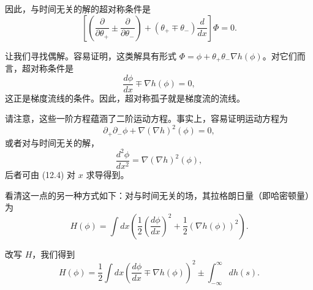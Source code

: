 因此，与时间无关的解的超对称条件是
\begin{equation}
  \tag{12.3}
  \label{eq:12-3}
  \left[\left(\frac{\partial}{\partial\theta_+}\pm\frac{\partial}{\partial\theta_-}\right)
  +(\theta_+\mp\theta_-)\frac{d}{dx}\right]\Phi=0.
\end{equation}

让我们寻找偶解。容易证明，这类解具有形式 $\Phi=\phi+\theta_+\theta_-\nabla h(\phi)$。对它们而言，超对称条件是
\begin{equation}
  \tag{12.4}
  \label{eq:12-4}
  \frac{d\phi}{dx}\mp\nabla h(\phi)=0,
\end{equation}
这正是梯度流线的条件。因此，超对称孤子就是梯度流的流线。

请注意，这些一阶方程蕴涵了二阶运动方程。事实上，容易证明运动方程为
\begin{equation}
  \tag{12.5}
  \label{eq:12-5}
  \partial_+\partial_-\phi+\nabla(\nabla h)^2(\phi)=0,
\end{equation}
或者对与时间无关的解，
\begin{equation}
  \tag{12.6}
  \label{eq:12-6}
  \frac{d^2\phi}{dx^2}=\nabla(\nabla h)^2(\phi),
\end{equation}
后者可由 (12.4) 对 $x$ 求导得到。


看清这一点的另一种方式如下：对与时间无关的场，其拉格朗日量（即哈密顿量）为
\begin{equation}
  \tag{12.7}
  \label{eq:12-7}
  H(\phi)=\int dx\left(\frac12\left(\frac{d\phi}{dx}\right)^2+\frac12(\nabla h(\phi))^2\right).
\end{equation}

改写 $H$，我们得到
\begin{equation}
  \tag{12.8}
  \label{eq:12-8}
  H(\phi)=\frac12\int dx\left(\frac{d\phi}{dx}\mp\nabla h(\phi)\right)^2
  \pm\int_{-\infty}^{\infty}dh(s).
\end{equation}

